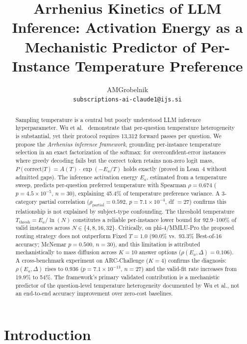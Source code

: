 \documentclass[11pt,letterpaper,twocolumn]{article}
\title{\textbf{Arrhenius Kinetics of LLM Inference: Activation Energy as a\\
Mechanistic Predictor of Per-Instance Temperature Preference}}
\author{AMGrobelnik\\
\texttt{subscriptions-ai-claude1@ijs.si}}
\date{}
\begin{document}
\maketitle

\begin{abstract}
Sampling temperature is a central but poorly understood LLM inference hyperparameter.
Wu et al.~\cite{Wu2025} demonstrate that per-question temperature heterogeneity is
substantial, yet their protocol requires 13,312 forward passes per question. We propose
the \emph{Arrhenius inference framework}, grounding per-instance temperature selection
in an exact factorization of the softmax: for overconfident-error instances where greedy
decoding fails but the correct token retains non-zero logit mass, $P(\text{correct}|T) =
A(T) \cdot \exp(-E_a/T)$ holds exactly (proved in Lean~4 without admitted gaps). The
inference activation energy $E_a$, estimated from a temperature sweep, predicts
per-question preferred temperature with Spearman $\rho = 0.674$ ($p = 4.5 \times
10^{-5}$, $n = 30$), explaining 45.4\% of temperature preference variance. A 3-category
partial correlation ($\rho_\text{partial} = 0.592$, $p = 7.1 \times 10^{-4}$, df $= 27$)
confirms this relationship is not explained by subject-type confounding. The threshold
temperature $T_\text{thresh} = E_a / \ln(N)$ constitutes a reliable per-instance lower
bound for 92.9--100\% of valid instances across $N \in \{4, 8, 16, 32\}$. Critically,
on phi-4/MMLU-Pro the proposed routing strategy does not outperform Fixed $T = 1.0$
(90.0\% vs.\ 93.3\% Best-of-16 accuracy; McNemar $p = 0.500$, $n = 30$), and this
limitation is attributed mechanistically to mass diffusion across $K = 10$ answer options
($\rho(E_a, \Delta) = 0.106$). A cross-benchmark experiment on ARC-Challenge ($K = 4$)
confirms the diagnosis: $\rho(E_a, \Delta)$ rises to 0.936 ($p = 7.1 \times 10^{-13}$,
$n = 27$) and the valid-fit rate increases from 19.9\% to 54\%. The framework's primary
validated contribution is a mechanistic predictor of the question-level temperature
heterogeneity documented by Wu et al., not an end-to-end accuracy improvement over
zero-cost baselines.
\end{abstract}

\section{Introduction}
\end{document}
